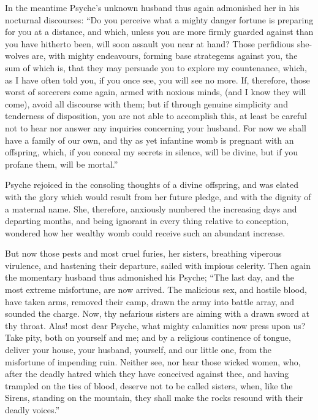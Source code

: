 \documentclass[12pt]{article}
\begin{document}
In the meantime Psyche's unknown husband thus again admonished her in his
nocturnal discourses: ``Do you perceive what a mighty danger fortune is
preparing for you at a distance, and which, unless you are more firmly guarded
against than you have hitherto been, will soon assault you near at hand? Those
perfidious she-wolves are, with mighty endeavours, forming base strategems
against you, the sum of which is, that they may persuade you to explore my
countenance, which, as I have often told you, if you once see, you will see no
more. If, therefore, those worst of sorcerers come again, armed with noxious
minds, (and I know they will come), avoid all discourse with them; but if
through genuine simplicity and tenderness of disposition, you are not able to
accomplish this, at least be careful not to hear nor answer any inquiries
concerning your husband. For now we shall have a family of our own, and thy as
yet infantine womb is pregnant with an offspring, which, if you conceal my
secrets in silence, will be divine, but if you profane them, will be mortal.''

Psyche rejoiced in the consoling thoughts of a divine offspring, and was elated
with the glory which would result from her future pledge, and with the dignity
of a maternal name. She, therefore, anxiously numbered the increasing days and
departing months, and being ignorant in every thing relative to conception,
wondered how her wealthy womb could receive such an abundant increase.

But now those pests and most cruel furies, her sisters, breathing viperous
virulence, and hastening their departure, sailed with impious celerity. Then
again the momentary husband thus admonished his Psyche; ``The last day, and the
most extreme misfortune, are now arrived. The malicious sex, and hostile blood,
have taken arms, removed their camp, drawn the army into battle array, and
sounded the charge. Now, thy nefarious sisters are aiming with a drawn sword at
thy throat. Alas! most dear Psyche, what mighty calamities now press upon us?
Take pity, both on yourself and me; and by a religious continence of tongue,
deliver your house, your husband, yourself, and our little one, from the
misfortune of impending ruin. Neither see, nor hear those wicked women, who,
after the deadly hatred which they have conceived against thee, and having
trampled on the ties of blood, deserve not to be called sisters, when, like the
Sirens, standing on the mountain, they shall make the rocks resound with their
deadly voices.''
\end{document}
